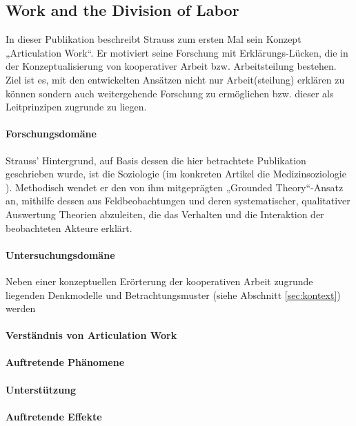 \subsection{Work and the Division of Labor}

In dieser Publikation \citep{Strauss85} beschreibt Strauss zum ersten Mal sein Konzept „Articulation Work“. Er motiviert seine Forschung mit Erklärungs-Lücken, die in der Konzeptualisierung von kooperativer Arbeit bzw. Arbeitsteilung bestehen. Ziel ist es, mit den entwickelten Ansätzen nicht nur Arbeit(steilung) erklären zu können sondern auch weitergehende Forschung zu ermöglichen bzw. dieser als Leitprinzipen zugrunde zu liegen. 

\paragraph{Forschungsdomäne}
Strauss' Hintergrund, auf Basis dessen die hier betrachtete Publikation geschrieben wurde, ist die Soziologie (im konkreten Artikel die Medizinsoziologie \citep[vgl.][]{Siegrist05}). Methodisch wendet er den von ihm mitgeprägten „Grounded Theory“-Ansatz \citep{Glaser77} an, mithilfe dessen aus Feldbeobachtungen und deren systematischer, qualitativer Auswertung Theorien abzuleiten, die das Verhalten und die Interaktion der beobachteten Akteure erklärt.

\paragraph{Untersuchungsdomäne}
Neben einer konzeptuellen Erörterung der kooperativen Arbeit zugrunde liegenden Denkmodelle und Betrachtungsmuster (siehe Abschnitt \ref{sec:kontext}) werden  

\paragraph{Verständnis von Articulation Work}

\paragraph{Auftretende Phänomene}

\paragraph{Unterstützung}

\paragraph{Auftretende Effekte}

